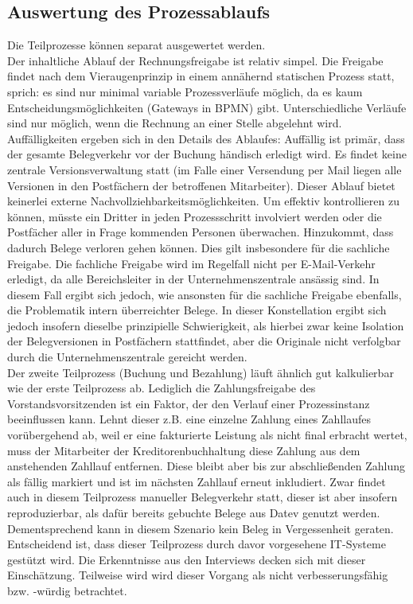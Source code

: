\subsection{Auswertung des Prozessablaufs}
Die Teilprozesse können separat ausgewertet werden.\\
Der inhaltliche Ablauf der Rechnungsfreigabe ist relativ simpel.
Die Freigabe findet nach dem Vieraugenprinzip in einem annähernd statischen Prozess statt, sprich: es sind nur minimal variable Prozessverläufe möglich, da es kaum Entscheidungsmöglichkeiten (Gateways in BPMN) gibt.
Unterschiedliche Verläufe sind nur möglich, wenn die Rechnung an einer Stelle abgelehnt wird.\\
Auffälligkeiten ergeben sich in den Details des Ablaufes: 
Auffällig ist primär, dass der gesamte Belegverkehr vor der Buchung händisch erledigt wird. 
Es findet keine zentrale Versionsverwaltung statt (im Falle einer Versendung per Mail liegen alle Versionen in den Postfächern der betroffenen Mitarbeiter).
Dieser Ablauf bietet keinerlei externe Nachvollziehbarkeitsmöglichkeiten.
Um effektiv kontrollieren zu können, müsste ein Dritter in jeden Prozessschritt involviert werden oder die Postfächer aller in Frage kommenden Personen überwachen.
Hinzukommt, dass dadurch Belege verloren gehen können.
Dies gilt insbesondere für die sachliche Freigabe.
Die fachliche Freigabe wird im Regelfall nicht per E-Mail-Verkehr erledigt, da alle Bereichsleiter in der Unternehmenszentrale ansässig sind. 
In diesem Fall ergibt sich jedoch, wie ansonsten für die sachliche Freigabe ebenfalls, die Problematik intern überreichter Belege.
In dieser Konstellation ergibt sich jedoch insofern dieselbe prinzipielle Schwierigkeit, als hierbei zwar keine Isolation der Belegversionen in Postfächern stattfindet, aber die Originale nicht verfolgbar durch die Unternehmenszentrale gereicht werden.
\\[1\baselineskip]
Der zweite Teilprozess (Buchung und Bezahlung) läuft ähnlich gut kalkulierbar wie der erste Teilprozess ab.
Lediglich die Zahlungsfreigabe des Vorstandsvorsitzenden ist ein Faktor, der den Verlauf einer Prozessinstanz beeinflussen kann. 
Lehnt dieser z.B. eine einzelne Zahlung eines Zahllaufes vorübergehend ab, weil er eine fakturierte Leistung als nicht final erbracht wertet, muss der Mitarbeiter der Kreditorenbuchhaltung diese Zahlung aus dem anstehenden Zahllauf entfernen.
Diese bleibt aber bis zur abschließenden Zahlung als fällig markiert und ist im nächsten Zahllauf erneut inkludiert.
Zwar findet auch in diesem Teilprozess manueller Belegverkehr statt, dieser ist aber insofern reproduzierbar, als dafür bereits gebuchte Belege aus Datev genutzt werden. 
Dementsprechend kann in diesem Szenario kein Beleg in Vergessenheit geraten.
Entscheidend ist, dass dieser Teilprozess durch davor vorgesehene IT-Systeme gestützt wird.
Die Erkenntnisse aus den Interviews decken sich mit dieser Einschätzung.
Teilweise wird wird dieser Vorgang als nicht verbesserungsfähig bzw. -würdig betrachtet.



